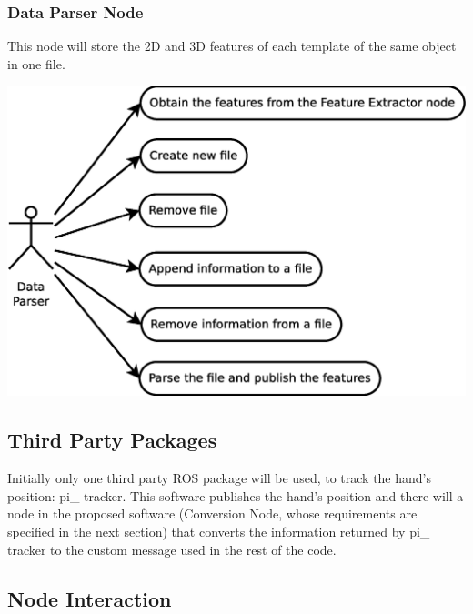 \documentclass{article}
\begin{document}
\subsubsection{Data Parser Node}
This node will store the 2D and 3D features of each template of the same object in one file. 
\begin{center}
	\includegraphics[scale=0.4]{../diagrams/images/uc_data_parser.eps}
\end{center}


\subsection{Third Party Packages}
\hspace{0.5cm}Initially only one third party ROS package will be used, to track the hand's position: pi\_ tracker. This software publishes the hand's position and there will a node in the proposed software (Conversion Node, whose requirements are specified in the next section) that converts the information returned by pi\_ tracker to the custom message used in the rest of the code.  

\subsection{Node Interaction}
\end{document}
